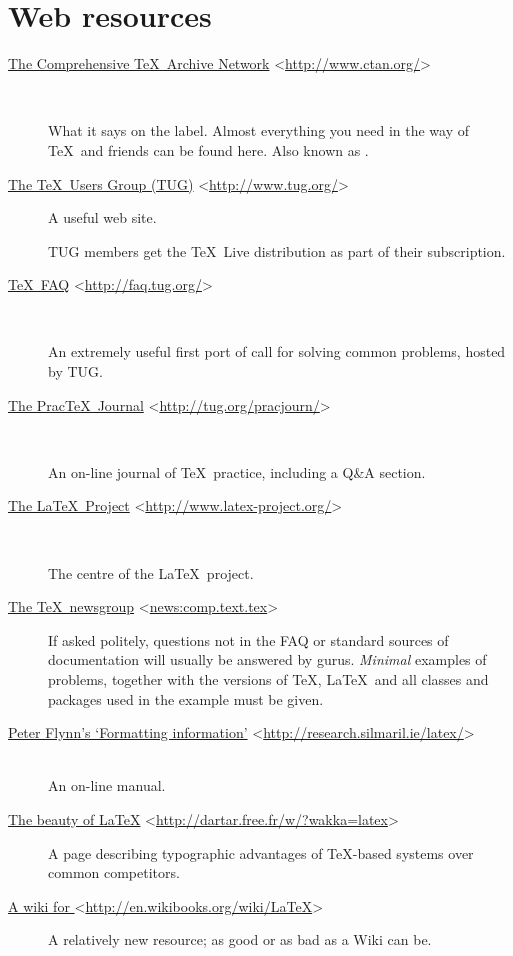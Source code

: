 \documentclass[authoryearcitations]{UoYCSproject}
\begin{document}
\section{Web resources}
\label{sec:webresources}

\newcommand{\wwwr}[2]{\item[\href{#1}{#2} \textless\url{#1}\textgreater]}
\begin{description}
  \wwwr{http://www.ctan.org/}{The Comprehensive \TeX\ Archive Network}\
  
  What it says on the label.  Almost everything you need in the way of
  \TeX\ and friends can be found here.  Also known as \CTAN.

\wwwr{http://www.tug.org/}{The \TeX\ Users Group (TUG)} A useful web
  site.
  
  TUG members get the \TeX~Live distribution as part of their
  subscription.

\wwwr{http://faq.tug.org/}{\TeX~FAQ}\

  An extremely useful first port of call for solving common problems,
  hosted by TUG.

\wwwr{http://tug.org/pracjourn/}{The Prac\TeX\ Journal}\

  An on-line journal of \TeX\ practice, including a Q\&A section.

\wwwr{http://www.latex-project.org/}{The \LaTeX\ Project}\

  The centre of the \LaTeX\ project.
  
\wwwr{news:comp.text.tex}{The \TeX\ newsgroup}
  
  If asked politely, questions not in the FAQ or standard sources of
  documentation will usually be answered by gurus.  \emph{Minimal}
  examples of problems, together with the versions of \TeX, \LaTeX\ 
  and all classes and packages used in the example must be given.

\wwwr{http://research.silmaril.ie/latex/}{Peter Flynn's `Formatting
  information'}

  \ \\An on-line \LaTeXe{} manual.

\wwwr{http://dartar.free.fr/w/?wakka=latex}{The beauty of \LaTeX{}}

  A page describing typographic advantages of \TeX-based systems over
  common competitors.

\wwwr{http://en.wikibooks.org/wiki/LaTeX}{A wiki for \LaTeXe{}}

  A relatively new resource; as good or as bad as a Wiki can be.


\end{description}
\end{document}
